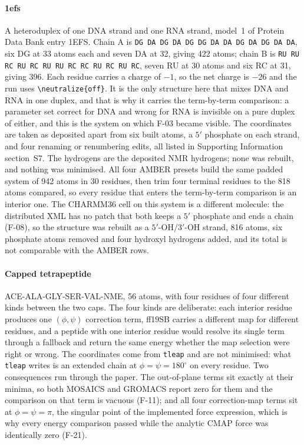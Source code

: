 \paragraph{1efs}
A heteroduplex of one DNA strand and one RNA strand, model~1 of Protein Data
Bank entry 1EFS\cite{pdb1efs,hantz2001hybrid}. Chain A is
\texttt{DG DA DG DA DG DG DA DA DG DA DG DA DA}, six DG at 33 atoms each and
seven DA at 32, giving 422 atoms; chain B is
\texttt{RU RU RC RU RC RU RU RC RC RU RC RU RC}, seven RU at 30 atoms and six
RC at 31, giving 396. Each residue carries a charge of $-1$, so the net charge
is $-26$ and the run uses \verb|\neutralize{off}|. It is the only structure
here that mixes DNA and RNA in one duplex, and that is why it carries the
term-by-term comparison: a parameter set correct for DNA and wrong for RNA is
invisible on a pure duplex of either, and this is the system on which F-03
became visible. The coordinates are taken as deposited apart from six built
atoms, a $5'$ phosphate on each strand, and four renaming or renumbering edits,
all listed in Supporting Information section~S7. The hydrogens are the
deposited NMR hydrogens; none was rebuilt, and nothing was minimised. All four
AMBER presets build the same padded system of 942 atoms in 30 residues, then
trim four terminal residues to the 818 atoms compared, so every residue that
enters the term-by-term comparison is an interior one. The CHARMM36 cell on
this system is a different molecule: the distributed XML has no patch that both
keeps a $5'$ phosphate and ends a chain (F-08), so the structure was rebuilt as
a $5'$-OH/$3'$-OH strand, 816 atoms, six phosphate atoms removed and four
hydroxyl hydrogens added, and its total is not comparable with the AMBER rows.

\paragraph{Capped tetrapeptide}
ACE-ALA-GLY-SER-VAL-NME, 56 atoms, with four residues of four different kinds
between the two caps. The four kinds are deliberate: each interior residue
produces one $(\phi,\psi)$ correction term, ff19SB carries a different map for
different residues, and a peptide with one interior residue would resolve its
single term through a fallback and return the same energy whether the map
selection were right or wrong. The coordinates come from \texttt{tleap} and are
not minimised: what \texttt{tleap} writes is an extended chain at
$\phi=\psi=180^{\circ}$ on every residue. Two consequences run through the
paper. The out-of-plane terms sit exactly at their minima, so both MOSAICS and
GROMACS report zero for them and the comparison on that term is vacuous
(F-11); and all four correction-map terms sit at $\phi=\psi=\pi$, the singular
point of the implemented force expression, which is why every energy comparison
passed while the analytic CMAP force was identically zero (F-21).

